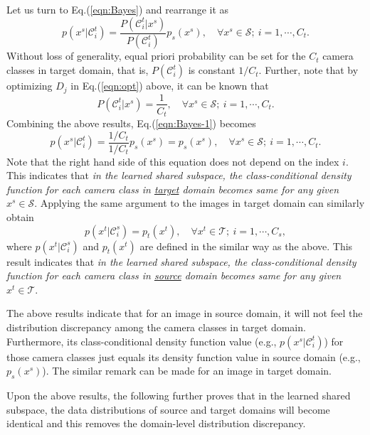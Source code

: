 \documentclass[10pt,twocolumn,letterpaper]{article}
\begin{document}
Let us turn to Eq.(\ref{eqn:Bayes}) and rearrange it as
\begin{equation}\label{eqn:Bayes-1}
p(x^s|\mathcal{C}^t_i) = \frac{P(\mathcal{C}^t_i|x^s)}{P(\mathcal{C}^t_i)}p_s(x^s),\quad \forall x^s \in {\mathcal S};~i=1,\cdots,C_t. 
\end{equation}Without loss of generality, equal priori probability can be set for the $C_t$ camera classes in target domain, that is, $P(\mathcal{C}^t_i)$ is constant $1/C_t$. Further, note that by optimizing $D_j$ in Eq.(\ref{eqn:opt}) above, it can be known that 
\begin{equation}\label{eqn:Bayes-1-1}
P(\mathcal{C}^t_i|x^s)=\frac{1}{C_t},\quad \forall x^s \in {\mathcal S};~i=1,\cdots,C_t.  
\end{equation}
Combining the above results, Eq.(\ref{eqn:Bayes-1}) becomes
\begin{equation}\label{eqn:Bayes-2}
p(x^s|\mathcal{C}^t_i) = \frac{1/C_t}{1/C_t}p_s(x^s)=p_s(x^s),\quad \forall x^s \in {\mathcal S};~i=1,\cdots,C_t. 
\end{equation}Note that the right hand side of this equation does not depend on the index $i$. This indicates that \textit{in the learned shared subspace, the class-conditional density function for each camera class in \underline{target} domain becomes same for any given $x^s \in {\mathcal S}$}. Applying the same argument to the images in target domain can similarly obtain 
\begin{equation}\label{eqn:Bayes-3}
p(x^t|\mathcal{C}^s_i) = p_t(x^t),\quad \forall x^t \in {\mathcal T};~i=1,\cdots,C_s, 
\end{equation}where $p(x^t|\mathcal{C}^s_i)$ and $p_t(x^t)$ are defined in the similar way as the above. This result indicates that \textit{in the learned shared subspace, the class-conditional density function for each camera class in \underline{source} domain becomes same for any given $x^t \in {\mathcal T}$}. 

The above results indicate that for an image in source domain, it will not feel the distribution discrepancy among the camera classes in target domain. Furthermore, its class-conditional density function value (e.g., $p(x^s|\mathcal{C}^t_i)$) for those camera classes just equals its density function value in source domain (e.g., $p_s(x^s)$). The similar remark can be made for an image in target domain. 

Upon the above results, the following further proves that in the learned shared subspace, the data distributions of source and target domains will become identical and this removes the domain-level distribution discrepancy. 
\end{document}
